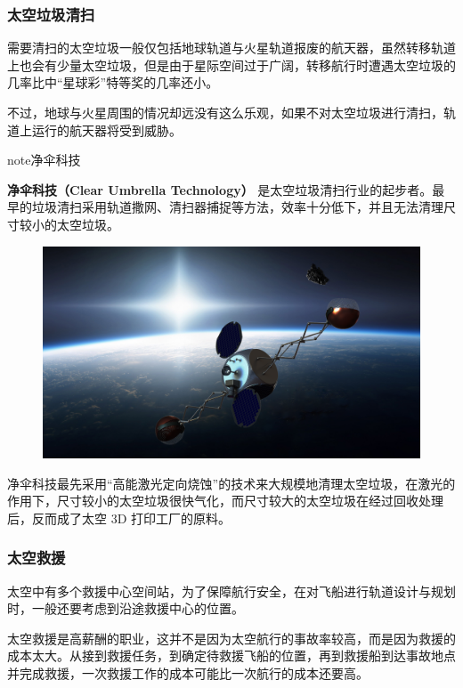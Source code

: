 \documentclass[letterpaper,10pt]{sphinxmanual}
\begin{document}
\subsubsection{太空垃圾清扫}
\label{profession:id8}
需要清扫的太空垃圾一般仅包括地球轨道与火星轨道报废的航天器，虽然转移轨道上也会有少量太空垃圾，但是由于星际空间过于广阔，转移航行时遭遇太空垃圾的几率比中“星球彩”特等奖的几率还小。

不过，地球与火星周围的情况却远没有这么乐观，如果不对太空垃圾进行清扫，轨道上运行的航天器将受到威胁。

\begin{notice}{note}{净伞科技}

\textbf{净伞科技（Clear Umbrella Technology）} 是太空垃圾清扫行业的起步者。最早的垃圾清扫采用轨道撒网、清扫器捕捉等方法，效率十分低下，并且无法清理尺寸较小的太空垃圾。
\begin{figure}[htbp]
\centering

\includegraphics{1280px-Sling-Sat_removing_space_debris.png}
\end{figure}

净伞科技最先采用“高能激光定向烧蚀”的技术来大规模地清理太空垃圾，在激光的作用下，尺寸较小的太空垃圾很快气化，而尺寸较大的太空垃圾在经过回收处理后，反而成了太空 3D 打印工厂的原料。
\end{notice}


\subsubsection{太空救援}
\label{profession:id9}
太空中有多个救援中心空间站，为了保障航行安全，在对飞船进行轨道设计与规划时，一般还要考虑到沿途救援中心的位置。

太空救援是高薪酬的职业，这并不是因为太空航行的事故率较高，而是因为救援的成本太大。从接到救援任务，到确定待救援飞船的位置，再到救援船到达事故地点并完成救援，一次救援工作的成本可能比一次航行的成本还要高。
\end{document}
